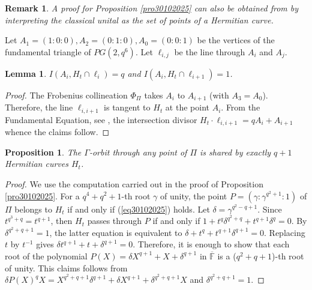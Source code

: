 \documentclass[9pt]{article}
\theoremstyle{plain}
\newtheorem{lem}[thm]{Lemma}
\newtheorem{rem}[thm]{Remark}
\newtheorem{prop}[thm]{Proposition}
\begin{document}
\begin{rem} {\em{A proof for Proposition \ref{pro30102025} can also be obtained from \cite[Proposition 2.5]{CEK} by interpreting the classical unital as the set of points of a Hermitian curve.}}  
\end{rem} Let $A_1=(1:0:0),A_2=(0:1:0),A_0=(0:0:1)$ be the vertices of the fundamental triangle of $PG(2,q^6)$. Let $\ell_{i,j}$ be the line through $A_i$ and $A_j$.   
\begin{lem}
\label{lem13112025} $I(A_i,H_t\cap \ell_i)=q$ and $I(A_i,H_t\cap \ell_{i+1})=1$.  
\end{lem}
\begin{proof} The Frobenius collineation $\Phi_{\Pi}$ takes $A_i$ to $A_{i+1}$ (with $A_3=A_0$). Therefore, the line $\ell_{i,i+1}$ is tangent to $H_t$ at the point $A_i$. 
From the Fundamental Equation, see \cite[Section 10.8]{HKT}, the intersection divisor $H_t\cdot \ell_{i,i+1}=qA_i+A_{i+1}$ whence the claims follow. 
\end{proof}
\begin{prop}
\label{pro02112025A} The $\Gamma$-orbit through any point of $\Pi$ is shared by exactly $q+1$ Hermitian curves $H_t$.  
\end{prop}
\begin{proof} We use the computation carried out in the proof of Proposition \ref{pro30102025}. 
For a $q^4+q^2+1$-th root $\gamma$ of unity, the point $P=(\gamma:\gamma^{q^2+1}:1)$ of $\Pi$ belongs to $H_t$ if and only
if (\ref{eq30102025}) holds. Let $\delta=\gamma^{q^2-q+1}$. Since $t^{q^3+q}=t^{q+1}$, then $H_t$ passes through $P$ if and only if $1+t^q\delta^{q^2+q}+t^{q+1}\delta^q=0$. By $\delta^{q^2+q+1}=1$, the latter equation is equivalent to  
$\delta+t^q+t^{q+1}\delta^{q+1}=0$. Replacing $t$ by $t^{-1}$ gives $\delta t^{q+1}+t+\delta^{q+1}=0$. Therefore, it is enough to show that each root of the polynomial $P(X)=\delta X^{q+1}+X+\delta^{q+1}$ in $\overline{\mathbb{F}}$ is a ($q^2+q+1$)-th root of unity. This claims follows from $\delta P(X)^qX=X^{q^2+q+1}\delta^{q+1}+\delta X^{q+1}+\delta^{q^2+q+1}X$ and $\delta^{q^2+q+1}=1$.       
\end{proof}
\end{document}
